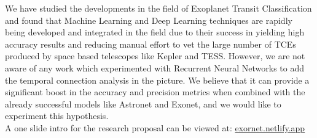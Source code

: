 We have studied the developments in the field of Exoplanet Transit Classification and found that Machine Learning and Deep Learning techniques are rapidly being developed and integrated in the field due to their success in yielding high accuracy results and reducing manual effort to vet the large number of TCEs produced by space based telescopes like Kepler and TESS. However, we are not aware of any work which experimented with Recurrent Neural Networks to add the temporal connection analysis in the picture. We believe that it can provide a significant boost in the accuracy and precision metrics when combined with the already successful models like Astronet and Exonet, and we would like to experiment this hypothesis.\\
A one slide intro for the research proposal can be viewed at:  \href{https://exornet.netlify.app}{exornet.netlify.app}